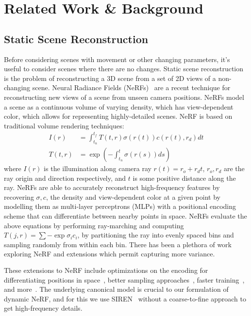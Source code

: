 \section*{Related Work \& Background}

\subsection*{Static Scene Reconstruction}

Before considering scenes with movement or other changing parameters, it's useful to consider scenes where there are no changes.
Static scene reconstruction is the problem of reconstructing a 3D scene from a set of 2D views of a non-changing scene. Neural Radiance Fields (NeRFs)~\cite{mildenhall2020nerf} are a recent technique for reconstructing new views of a scene from unseen camera positions. NeRFs model a scene as a continuous volume of varying density, which has view-dependent color, which allows for representing highly-detailed scenes. NeRF is based on traditional volume rendering techniques:
\begin{align}\label{eq:nerf}
I(r) &= \int_{t_n}^{t_f} T(t, r) \sigma(r(t)) c(r(t), r_d)dt \nonumber \\
T(t, r) &= \exp(-\int_{t_n}^{t} \sigma(r(s))ds)
\end{align}
\noindent
where $I(r)$ is the illumination along camera ray $r(t) = r_o + r_d t$, $r_o, r_d$ are the ray origin and direction respectively, and $t$ is some positive distance along the ray. NeRFs are able to accurately reconstruct high-frequency features by recovering $\sigma,c$, the density and view-dependent color at a given point by modelling them as multi-layer perceptrons (MLPs) with a positional encoding scheme that can differentiate between nearby points in space. NeRFs evaluate the above equations by performing ray-marching and computing $T(j,r) = \sum -\exp\sigma_i c_i$, by partitioning the ray into evenly spaced bins and sampling randomly from within each bin. There has been a plethora of work exploring NeRF and extensions which permit capturing more variance.

These extensions to NeRF include optimizations on the encoding for differentiating positions in space~\cite{tancik2020fourfeat}, better sampling approaches~\cite{barron2021mipnerf}, faster training~\cite{yu2021plenoxels}, and more~\cite{sitzmann2019siren,bi2020neural,srinivasan2020nerv,boss2021nerd}. The underlying canonical model is crucial to our formulation of dynamic NeRF, and for this we use SIREN~\cite{sitzmann2019siren} without a coarse-to-fine approach to get high-frequency details.

